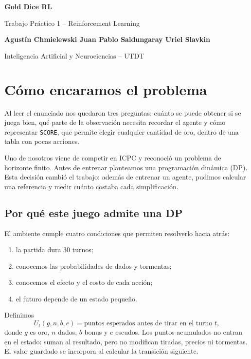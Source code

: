 \documentclass[10pt,a4paper]{article}
\begin{document}
\begin{center}
    {\LARGE\bfseries\color{azul} Gold Dice RL}\par
    \vspace{2pt}
    {\large Trabajo Práctico 1 -- Reinforcement Learning}\par
    \vspace{5pt}
    \textbf{Agustín Chmielewski \quad Juan Pablo Saldungaray \quad Uriel Slavkin}\par
    \vspace{2pt}
    Inteligencia Artificial y Neurociencias -- UTDT
\end{center}

\section{Cómo encaramos el problema}

Al leer el enunciado nos quedaron tres preguntas: cuánto se puede obtener si se juega bien, qué parte de la observación necesita recordar el agente y cómo representar \texttt{SCORE}, que permite elegir cualquier cantidad de oro, dentro de una tabla con pocas acciones.

Uno de nosotros viene de competir en ICPC y reconoció un problema de horizonte finito. Antes de entrenar planteamos una programación dinámica (DP). Esta decisión cambió el trabajo: además de entrenar un agente, pudimos calcular una referencia y medir cuánto costaba cada simplificación.

\subsection{Por qué este juego admite una DP}

El ambiente cumple cuatro condiciones que permiten resolverlo hacia atrás:

\begin{enumerate}[leftmargin=17pt,itemsep=1pt,topsep=1pt]
    \item la partida dura 30 turnos;
    \item conocemos las probabilidades de dados y tormentas;
    \item conocemos el efecto y el costo de cada acción;
    \item el futuro depende de un estado pequeño.
\end{enumerate}

Definimos
\[
U_t(g,n,b,e)=\text{puntos esperados antes de tirar en el turno }t,
\]
donde $g$ es oro, $n$ dados, $b$ bonus y $e$ escudos. Los puntos acumulados no entran en el estado: suman al resultado, pero no modifican tiradas, precios ni tormentas. El valor guardado se incorpora al calcular la transición siguiente.
\end{document}
